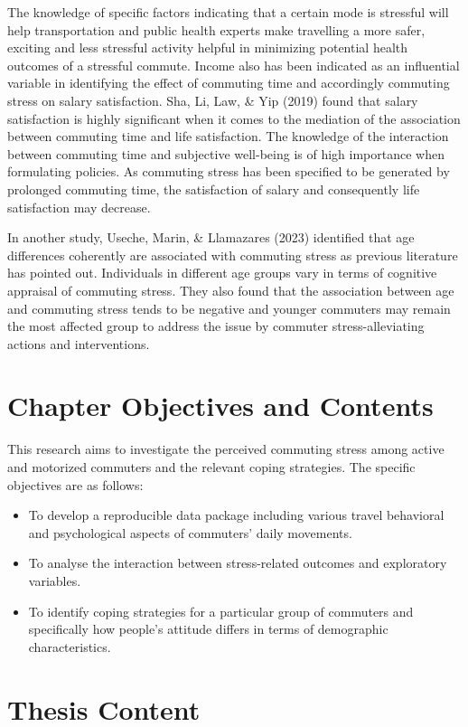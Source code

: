 \documentclass[
11pt, %
oneside, %
english, %
singlespacing, %
]{macthesis} %
\begin{document}
The knowledge of specific factors indicating that a certain mode is stressful will help transportation and public health experts make travelling a more safer, exciting and less stressful activity helpful in minimizing potential health outcomes of a stressful commute. Income also has been indicated as an influential variable in identifying the effect of commuting time and accordingly commuting stress on salary satisfaction. Sha, Li, Law, \& Yip (2019) found that salary satisfaction is highly significant when it comes to the mediation of the association between commuting time and life satisfaction. The knowledge of the interaction between commuting time and subjective well-being is of high importance when formulating policies. As commuting stress has been specified to be generated by prolonged commuting time, the satisfaction of salary and consequently life satisfaction may decrease.

In another study, Useche, Marin, \& Llamazares (2023) identified that age differences coherently are associated with commuting stress as previous literature has pointed out. Individuals in different age groups vary in terms of cognitive appraisal of commuting stress. They also found that the association between age and commuting stress tends to be negative and younger commuters may remain the most affected group to address the issue by commuter stress-alleviating actions and interventions.

\hypertarget{chapter-objectives-and-contents}{%
\section{Chapter Objectives and Contents}\label{chapter-objectives-and-contents}}

This research aims to investigate the perceived commuting stress among active and motorized commuters and the relevant coping strategies. The specific objectives are as follows:
\begin{itemize}
\item
  To develop a reproducible data package including various travel behavioral and psychological aspects of commuters' daily movements.
\item
  To analyse the interaction between stress-related outcomes and exploratory variables.
\item
  To identify coping strategies for a particular group of commuters and specifically how people's attitude differs in terms of demographic characteristics.
\end{itemize}
\hypertarget{thesis-content}{%
\section{Thesis Content}\label{thesis-content}}
\end{document}
